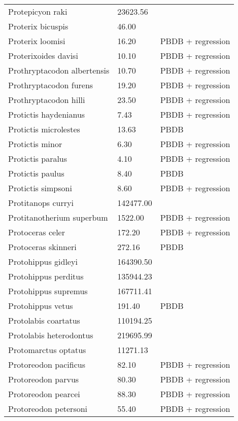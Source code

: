 \documentclass{article}
\begin{document}
\begin{center}
\begin{longtable}{p{} p{} p{}}
    Protepicyon raki & 23623.56 & \cite{Tomiya2013} \\ 
    Proterix bicuspis & 46.00 & \cite{Coombs1979} \\ 
    Proterix loomisi & 16.20 & PBDB + regression \\ 
    Proterixoides davisi & 10.10 & PBDB + regression \\ 
    Prothryptacodon albertensis & 10.70 & PBDB + regression \\ 
    Prothryptacodon furens & 19.20 & PBDB + regression \\ 
    Prothryptacodon hilli & 23.50 & PBDB + regression \\ 
    Protictis haydenianus & 7.43 & PBDB + regression \\ 
    Protictis microlestes & 13.63 & PBDB \\ 
    Protictis minor & 6.30 & PBDB + regression \\ 
    Protictis paralus & 4.10 & PBDB + regression \\ 
    Protictis paulus & 8.40 & PBDB \\ 
    Protictis simpsoni & 8.60 & PBDB + regression \\ 
    Protitanops curryi & 142477.00 & \cite{McKenna2011} \\ 
    Protitanotherium superbum & 1522.00 & PBDB + regression \\ 
    Protoceras celer & 172.20 & PBDB + regression \\ 
    Protoceras skinneri & 272.16 & PBDB \\ 
    Protohippus gidleyi & 164390.50 & \cite{Tomiya2013} \\ 
    Protohippus perditus & 135944.23 & \cite{Tomiya2013} \\ 
    Protohippus supremus & 167711.41 & \cite{Tomiya2013} \\ 
    Protohippus vetus & 191.40 & PBDB \\ 
    Protolabis coartatus & 110194.25 & \cite{Tomiya2013} \\ 
    Protolabis heterodontus & 219695.99 & \cite{Tomiya2013} \\ 
    Protomarctus optatus & 11271.13 & \cite{Tomiya2013} \\ 
    Protoreodon pacificus & 82.10 & PBDB + regression \\ 
    Protoreodon parvus & 80.30 & PBDB + regression \\ 
    Protoreodon pearcei & 88.30 & PBDB + regression \\ 
    Protoreodon petersoni & 55.40 & PBDB + regression \\ 

\end{longtable}
\end{center}
\end{document}
